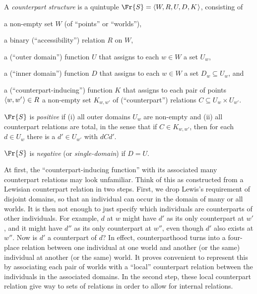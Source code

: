 \documentclass[11pt]{woarticle}
\newcommand{\cmnt}[1]{\iffalse #1 \fi}
\theoremstyle{break}
\theoremstyle{nonumberplain}
\newcommand{\1}{\;\,|\;\,}
\renewcommand{\t}[1]{\ensuremath{\langle #1  \makebox[.2ex]{}\rangle}}
\begin{document}
\begin{definition}\label{!CS}
  A \emph{counterpart structure} is a quintuple $\Fr{S} = \t{W,R,U,D,K}$,
  consisting of
  \begin{compactenum}
  \item a non-empty set $W$ (of ``points'' or ``worlds''),
  \item a binary (``accessibility'') relation $R$ on $W$,
  \item a (``outer domain'') function $U$ that assigns to each
    $w \!\in\! W$ a set $U_w$,
  \item a (``inner domain'') function $D$ that assigns to each
    $w \!\in\! W$ a set $D_w \subseteq U_w$, and
  \item a (``counterpart-inducing'') function $K$ that assigns to each
    pair of points $\t{w,w'} \in R$ a non-empty set $K_{w,w'}$ of
    (``counterpart'') relations $C \subseteq U_w \times U_{w'}$.
  \end{compactenum}

  $\Fr{S}$ is \emph{positive} if (i) all outer domains $U_{w}$ are non-empty and
  (ii) all counterpart relations are total, in the sense that if
  $C \in K_{w,w'}$, then for each $d \in U_w$ there is a $d'\in U_{w'}$ with
  $dCd'$.

  $\Fr{S}$ is \emph{negative} (or \emph{single-domain}) if $D=U$. 
\end{definition}

\cmnt{%
  Note that in single-domain models it can happen that $wRw'$ but no individual
  in $U_w$ has any counterpart at $w'$ (perhaps because $U_w$ is empty). There
  will still be exactly one counterpart relation $C \in K_{w,w'}$, namely the
  empty relation containing no ordered pairs at all.%
} %

At first, the ``counterpart-inducing function'' with its associated many
counterpart relations may look unfamiliar. Think of this as constructed from a
Lewisian counterpart relation in two steps. First, we drop Lewis's requirement
of disjoint domains, so that an individual can occur in the domain of many or
all worlds. It is then not enough to just specify which individuals are
counterparts of other individuals. For example, $d$ at $w$ might have $d'$ as
its only counterpart at $w'$, and it might have $d''$ as its only counterpart at
$w''$, even though $d'$ also exists at $w''$. Now is $d'$ a counterpart of $d$?
In effect, counterparthood turns into a four-place relation between one
individual at one world and another (or the same) individual at another (or the
same) world. It proves convenient to represent this by associating each pair of
worlds with a ``local'' counterpart relation between the individuals in the
associated domains. In the second step, these local counterpart relation give
way to sets of relations in order to allow for internal relations.
\end{document}

